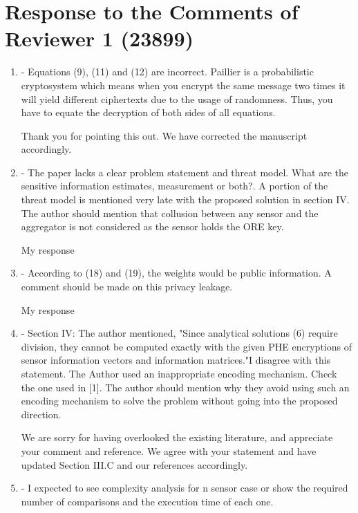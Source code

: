 \documentclass[a4paper]{scrartcl}
\newenvironment{rebuttal}{\begin{enumerate}[label={\color{grey}\thesection.\arabic{enumi}},leftmargin=0pt,ref=\thesection.\arabic{enumi}]}{\end{enumerate}}
\newcommand{\reviewtext}[1]{{\color{nblue} #1}}
\begin{document}
\section*{Response to the Comments of Reviewer 1 (23899)}
\def\thesection{R1}
\begin{rebuttal}
\item \reviewtext{- Equations (9), (11) and (12) are incorrect. Paillier is a
probabilistic cryptosystem which means when you encrypt the same
message two times it will yield different ciphertexts due to the usage
of randomness. Thus, you have to equate the decryption of both sides of
all equations. }

Thank you for pointing this out. We have corrected the manuscript accordingly.

\item \reviewtext{- The paper lacks a clear problem statement and threat model. What are
the sensitive information estimates, measurement or both?. A portion of
the threat model is mentioned very late with the proposed solution in
section IV. The author should mention that collusion between any sensor
and the aggregator is not considered as the sensor holds the ORE key. }

My response

\item \reviewtext{- According to (18) and (19), the weights would be public information.
A comment should be made on this privacy leakage.}

My response

\item \reviewtext{- Section IV: The author mentioned, "Since analytical solutions (6)
require division, they cannot be computed exactly with the given PHE
encryptions of sensor information vectors and information matrices."I
disagree with this statement. The Author used an inappropriate encoding
mechanism. Check the one used in [1]. The author should mention why
they avoid using such an encoding mechanism to solve the problem
without going into the proposed direction. }

We are sorry for having overlooked the existing literature, and appreciate your comment and reference. We agree with your statement and have updated Section III.C and our references accordingly.

\item \reviewtext{- I expected to see complexity analysis for n sensor case or show the
required number of comparisons and the execution time of each one. }


\end{rebuttal}
\end{document}
